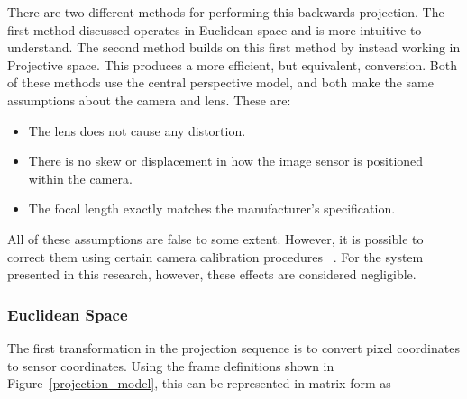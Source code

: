  There are two different methods for performing this backwards projection. The first method discussed operates in Euclidean space and is more intuitive to understand.  The second method builds on this first method by instead working in Projective space.  This produces a more efficient, but equivalent, conversion.  Both of these methods use the central perspective model, and both make the same assumptions about the camera and lens.  These are:
 \begin{itemize}
 \item The lens does not cause any distortion. 
 \item There is no skew or displacement in how the image sensor is positioned within the camera.
 \item The focal length exactly matches the manufacturer's specification.
 \end{itemize}

 All of these assumptions are false to some extent. However, it is possible to correct them using certain camera calibration procedures ~\citep{Zhang:1999}. For the system presented in this research, however, these effects are considered negligible. 
 
 \subsubsection{Euclidean Space}
 
 The first transformation in the projection sequence is to convert pixel coordinates to sensor coordinates.  Using the frame definitions shown in Figure~\ref{projection_model}, this can be represented in matrix form as 
 
